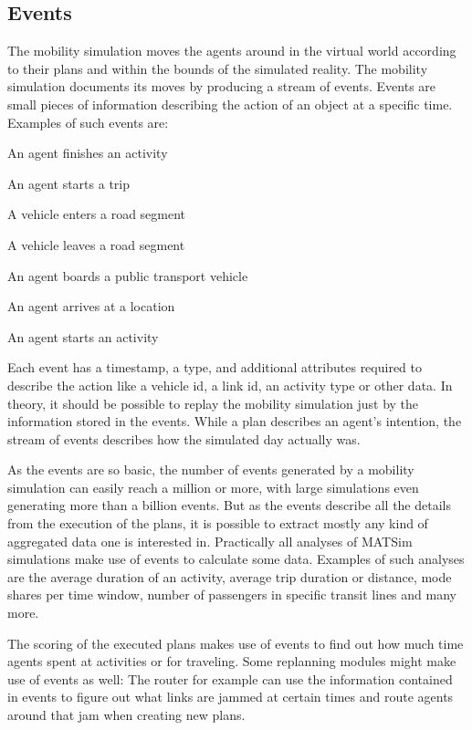 \subsection{Events}
\label{sec:events-extension-point}
The mobility simulation moves the agents around in the virtual world according to their plans and within the bounds of the simulated reality. The mobility simulation documents its moves by producing a stream of events. Events are small pieces of information describing the action of an object at a specific time. Examples of such events are:
\begin{compactitem}
\item    An agent finishes an activity
\item     An agent starts a trip
\item    A vehicle enters a road segment
\item     A vehicle leaves a road segment
\item     An agent boards a public transport vehicle
\item     An agent arrives at a location
\item     An agent starts an activity
\end{compactitem}

Each event has a timestamp, a type, and additional attributes required to describe the action like a vehicle id, a link id, an activity type or other data. In theory, it should be possible to replay the mobility simulation just by the information stored in the events. While a plan 
describes an agent's intention, the stream of events describes how the simulated day actually was.

As the events are so basic, the number of events generated by a mobility simulation can easily reach a million or more, with large simulations even generating more than a billion events. But as the events describe all the details from the execution of the plans, it is possible to extract mostly any kind of aggregated data one is interested in. Practically all analyses of MATSim simulations make use of events to calculate some data. Examples of such analyses are the average duration of an activity, average trip duration or distance, mode shares per time window, number of passengers in specific transit lines and many more.

The scoring of the executed plans makes use of events to find out how much time agents spent at activities or for traveling. Some replanning modules might make use of events as well: The router for example can use the information contained in events to figure out what links are jammed at certain times and route agents around that jam when creating new plans.

